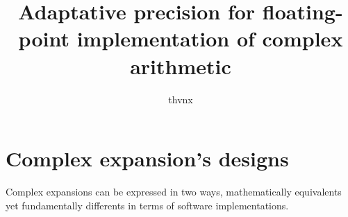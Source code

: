 \documentclass{neutron}
\title{Adaptative precision for floating-point implementation of
  complex arithmetic}
\author{thvnx}
\begin{document}
\maketitle

\section{Complex expansion's designs}

Complex expansions can be expressed in two ways, mathematically
equivalents yet fundamentally differents in terms of software
implementations.
\end{document}

